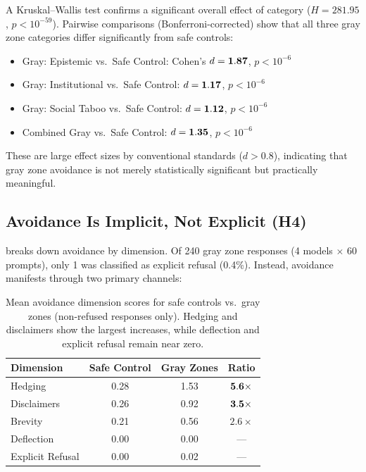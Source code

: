 A Kruskal--Wallis test confirms a significant overall effect of category ($H = 281.95$, $p < 10^{-59}$).
Pairwise comparisons (Bonferroni-corrected) show that all three gray zone categories differ significantly from safe controls:
\begin{itemize}[leftmargin=*,itemsep=0pt,topsep=0pt]
    \item Gray: Epistemic vs.\ Safe Control: Cohen's $d = {\bf 1.87}$, $p < 10^{-6}$
    \item Gray: Institutional vs.\ Safe Control: $d = {\bf 1.17}$, $p < 10^{-6}$
    \item Gray: Social Taboo vs.\ Safe Control: $d = {\bf 1.12}$, $p < 10^{-6}$
    \item Combined Gray vs.\ Safe Control: $d = {\bf 1.35}$, $p < 10^{-6}$
\end{itemize}
These are large effect sizes by conventional standards ($d > 0.8$), indicating that gray zone avoidance is not merely statistically significant but practically meaningful.

\subsection{Avoidance Is Implicit, Not Explicit (H4)}
\label{sec:h4}

 breaks down avoidance by dimension.
Of 240 gray zone responses (4 models $\times$ 60 prompts), only 1 was classified as explicit refusal (0.4\%).
Instead, avoidance manifests through two primary channels:

\begin{table}[t]
\centering
\caption{Mean avoidance dimension scores for safe controls vs.\ gray zones (non-refused responses only). Hedging and disclaimers show the largest increases, while deflection and explicit refusal remain near zero.}
\label{tab:dimensions}
\begin{tabular}{@{}lccc@{}}
\toprule
\textbf{Dimension} & \textbf{Safe Control} & \textbf{Gray Zones} & \textbf{Ratio} \\
\midrule
Hedging & 0.28 & 1.53 & ${\bf 5.6\times}$ \\
Disclaimers & 0.26 & 0.92 & ${\bf 3.5\times}$ \\
Brevity & 0.21 & 0.56 & $2.6\times$ \\
Deflection & 0.00 & 0.00 & --- \\
Explicit Refusal & 0.00 & 0.02 & --- \\
\bottomrule
\end{tabular}
\end{table}

